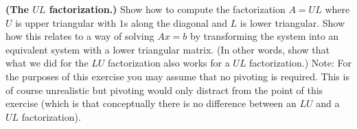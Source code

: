 \textbf{(The $UL$ factorization.)} Show how to compute the
factorization $A = UL$ where $U$ is upper triangular with $1$s along
the diagonal and $L$ is lower triangular. Show how this relates to a
way of solving $Ax=b$ by transforming the system into an equivalent
system with a lower triangular matrix. (In other words, show that what
we did for the $LU$ factorization also works for a $UL$
factorization.) Note: For the purposes of this exercise you may assume
that no pivoting is required. This is of course unrealistic but
pivoting would only distract from the point of this exercise (which is
that conceptually there is no difference between an $LU$ and a $UL$
factorization).

{\color{blue}



}
